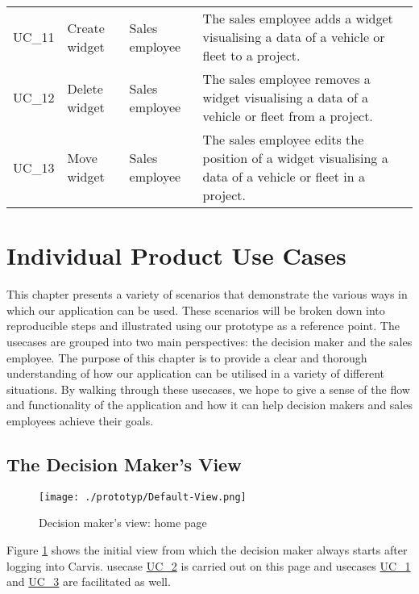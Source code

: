 \begin{footnotesize}
\begin{longtable}[i i i L]{ p{} p{} p{} p{} }
    \hypertarget{Ref:UC11}{UC\_11} & Create \gls{widget} & Sales employee & The sales employee adds a \gls{widget} visualising a \gls{data} of a vehicle or fleet to a project.\\
    \hypertarget{Ref:UC12}{UC\_12} & Delete \gls{widget} & Sales employee & The sales employee removes a \gls{widget} visualising a \gls{data} of a vehicle or fleet from a project.\\
    \hypertarget{Ref:UC13}{UC\_13} & Move \gls{widget} & Sales employee & The sales employee edits the position of a \gls{widget} visualising a \gls{data} of a vehicle or fleet in a project.\\
    \bottomrule
  \end{longtable}
\end{footnotesize}
\rmfamily

\section{Individual Product Use Cases}
This chapter presents a variety of scenarios that demonstrate the various ways in which our application can be used. These scenarios will be broken down into reproducible steps and illustrated using our prototype as a reference point. The \glspl{usecase} are grouped into two main perspectives: the decision maker and the sales employee. The purpose of this chapter is to provide a clear and thorough understanding of how our application can be utilised in a variety of different situations. By walking through these \glspl{usecase}, we hope to give a sense of the flow and functionality of the application and how it can help decision makers and sales employees achieve their goals.


\subsection{The Decision Maker's View}
\begin{figure}[H]
  \centering
  \texttt{[image: ./prototyp/Default-View.png]}
  \caption{Decision maker's view: home page}
  \label{DecisionMaker:Homepage}
\end{figure}

Figure \ref{DecisionMaker:Homepage} shows the initial view from which the decision maker always starts after logging into Carvis. \Gls{usecase} \hyperlink{Ref:UC2}{UC\_2} is carried out on this page and \glspl{usecase} \hyperlink{Ref:UC1}{UC\_1} and \hyperlink{Ref:UC3}{UC\_3} are facilitated as well. 


